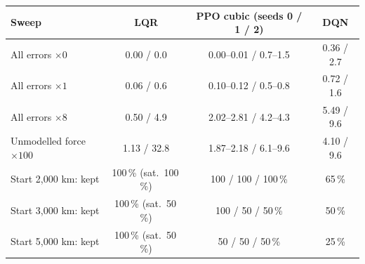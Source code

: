 \begin{tabular}{lccc}
\toprule
Sweep & LQR & PPO cubic (seeds 0 / 1 / 2) & DQN \\
\midrule
All errors $\times 0$ & 0.00 / 0.0 & 0.00--0.01 / 0.7--1.5 & 0.36 / 2.7 \\
All errors $\times 1$ & 0.06 / 0.6 & 0.10--0.12 / 0.5--0.8 & 0.72 / 1.6 \\
All errors $\times 8$ & 0.50 / 4.9 & 2.02--2.81 / 4.2--4.3 & 5.49 / 9.6 \\
Unmodelled force $\times 100$ & 1.13 / 32.8 & 1.87--2.18 / 6.1--9.6 & 4.10 / 9.6 \\
\midrule
Start 2{,}000 km: kept & 100\,\% (sat.\ 100\,\%) & 100 / 100 / 100\,\% & 65\,\% \\
Start 3{,}000 km: kept & 100\,\% (sat.\ 50\,\%) & 100 / 50 / 50\,\% & 50\,\% \\
Start 5{,}000 km: kept & 100\,\% (sat.\ 50\,\%) & 50 / 50 / 50\,\% & 25\,\% \\
\bottomrule
\end{tabular}

